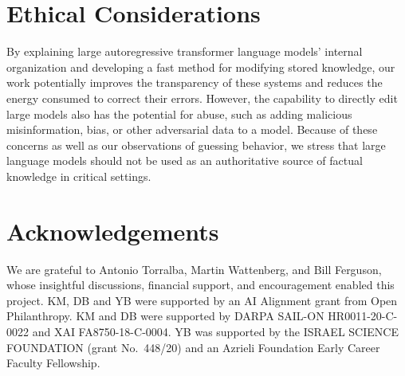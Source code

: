 \documentclass{article}
\begin{document}



\section{Ethical Considerations}
By explaining large autoregressive transformer language models' internal organization and developing a fast method for modifying stored knowledge, our work potentially improves the transparency of these systems and reduces the energy consumed to correct their errors.  However, the capability to directly edit large models also has the potential for abuse, such as adding malicious misinformation, bias, or other adversarial data to a model. Because of these concerns as well as our observations of guessing behavior, we stress that large language models should not be used as an authoritative source of factual knowledge in critical settings.


{\small
\section*{Acknowledgements}

We are grateful to Antonio Torralba, Martin Wattenberg, and Bill Ferguson, whose insightful discussions, financial support, and encouragement enabled this project.  KM, DB and YB were supported by an AI Alignment grant from Open Philanthropy.  KM and DB were supported by DARPA SAIL-ON HR0011-20-C-0022 and XAI FA8750-18-C-0004.  YB was supported by the ISRAEL SCIENCE FOUNDATION (grant No.\ 448/20) and an Azrieli Foundation Early Career Faculty Fellowship.
}




\newpage




\newpage

\appendix
\end{document}
